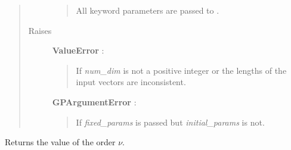 \documentclass[letterpaper,10pt,english]{sphinxmanual}
\begin{document}
\begin{fulllineitems}
\begin{quote}
\begin{description}
\begin{quote}
All keyword parameters are passed to {\hyperref[gptools.kernel:gptools.kernel.core.ChainRuleKernel]{}}.
\end{quote}

\item[{Raises}] \leavevmode
\textbf{ValueError} :
\begin{quote}

If \emph{num\_dim} is not a positive integer or the lengths of the input
vectors are inconsistent.
\end{quote}

\textbf{GPArgumentError} :
\begin{quote}

If \emph{fixed\_params} is passed but \emph{initial\_params} is not.
\end{quote}

\end{description}\end{quote}

\begin{fulllineitems}
\label{gptools.kernel:gptools.kernel.matern.MaternKernel.nu}
Returns the value of the order \(\nu\).

\end{fulllineitems}


\end{fulllineitems}

\end{document}
